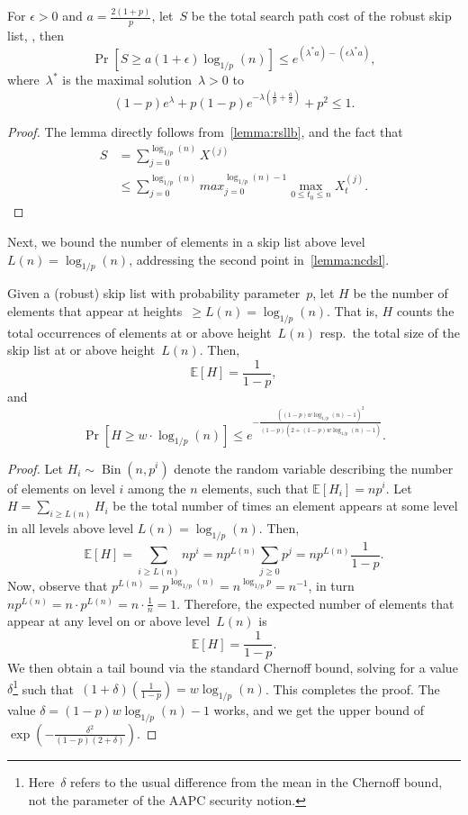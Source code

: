 \begin{lemma}\label{lemma:rslspc}
 For $\epsilon>0$ and $a=\frac{2(1+p)}{p}$, let~$S$ be the total search path cost of the robust skip list, , then \[\Pr[S \geq a(1+\epsilon) \log_{1/p}(n)]  \leq e^{(\lambda^{*}a) - (\epsilon\lambda^{*}a)},\]
 where~$\lambda^{*}$ is the maximal solution~$\lambda > 0$ to
 $$(1-p)e^{\lambda} + p(1-p)e^{-\lambda \left(\frac{1}{p} + \frac{a}{2} \right)} + p^2 \leq 1 .$$
\end{lemma}

\begin{proof}
The lemma directly follows from~\cref{lemma:rsllb}, and the fact that
\begin{align*}
    S &= \sum_{j=0}^{\log_{1/p}(n)} X^{(j)} \\
      &\leq \sum_{j=0}^{\log_{1/p}(n)} max_{j=0}^{\log_{1/p}(n)-1} \underset{0 \leq t_0 \leq n}{\max} X_t^{(j)}.
\end{align*}
\end{proof}

Next, we bound the number of elements in a skip list above level~$L(n) = \log_{1/p}(n)$, addressing the second point in~\cref{lemma:ncdsl}. 

\begin{lemma}\label{lemma:lvlbound}
    Given a (robust) skip list with probability parameter~$p$, let $H$ be the number of elements that appear at heights~$\geq L(n) = \log_{1/p}(n)$. That is, $H$ counts the total occurrences of elements at or above height~$L(n)$ resp.~the total size of the skip list at or above height~$L(n)$. Then,
    \[ \mathbb{E}[H] = \frac{1}{1-p}, \]
    and
    \[ \Pr\left[H \geq w \cdot \log_{1/p}(n)\right] \leq e^{-\frac{((1-p)w\log_{1/p}(n)-1)^{2}}{(1-p)(2+(1-p)w\log_{1/p}(n)-1)}}. \]
\end{lemma}

\begin{proof}
    Let $H_i\sim \operatorname{Bin}(n,p^i)$ denote the random variable describing the number of elements on level $i$ among the $n$ elements, such that $\mathbb{E}[H_i]=np^i$.
    Let $H = \sum_{i \ge L(n)} H_i$ be the total number of times an element appears at some level in all levels above level $L(n) = \log_{1/p}(n)$. Then,
    \[ \mathbb{E}[H] = \sum_{i \ge L(n)} np^{i} = np^{L(n)} \sum_{j \geq 0} p^{j} = np^{L(n) } \frac{1}{1-p}. \]
    Now, observe that $p^{L(n)} = p^{\log_{1/p}(n)} = n^{\log_{1/p} p} = n^{-1}$, in turn $np^{L(n) } = n \cdot p^{L(n)} = n \cdot \frac{1}{n}  = 1$. Therefore, the expected number of elements that appear at any level on or above level~$L(n)$ is
    \[ \mathbb{E}[H] = \frac{1}{1-p}. \]
    We then obtain a tail bound via the standard Chernoff bound, solving for a value $\delta$\footnote{Here~$\delta$ refers to the usual difference from the mean in the Chernoff bound, not the parameter of the AAPC security notion.} such that~$(1+\delta)\left(\frac{1}{1-p}\right) = w \log_{1/p}(n)$. This completes the proof. The value $\delta=(1-p)w\log_{1/p}(n)-1$ works, and we get the upper bound of $\exp\left(-\frac{\delta^2}{(1-p)(2+\delta)}\right)$.
\end{proof}

